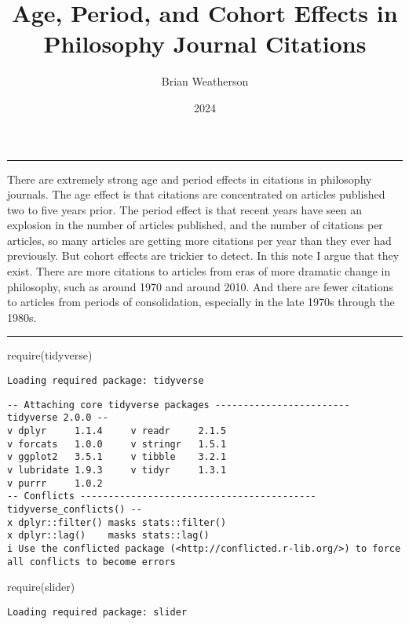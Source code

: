 \documentclass[
  10pt,
  letterpaper,
  DIV=11,
  numbers=noendperiod,
  twoside]{scrartcl}
\title{Age, Period, and Cohort Effects in Philosophy Journal Citations}
\author{Brian Weatherson}
\date{2024}
\newenvironment{Shaded}{\begin{snugshade}}{\end{snugshade}}
\newcommand{\FunctionTok}[1]{\textcolor[rgb]{0.28,0.35,0.67}{#1}}
\newcommand{\NormalTok}[1]{\textcolor[rgb]{0.00,0.23,0.31}{#1}}
\renewenvironment{abstract}
 {\vspace{-1.25cm}
 \quotation\small\noindent\rule{\linewidth}{.5pt}\par\smallskip
 \noindent }
 {\par\noindent\rule{\linewidth}{.5pt}\endquotation}
\begin{document}
\maketitle
\begin{abstract}
There are extremely strong age and period effects in citations in
philosophy journals. The age effect is that citations are concentrated
on articles published two to five years prior. The period effect is that
recent years have seen an explosion in the number of articles published,
and the number of citations per articles, so many articles are getting
more citations per year than they ever had previously. But cohort
effects are trickier to detect. In this note I argue that they exist.
There are more citations to articles from eras of more dramatic change
in philosophy, such as around 1970 and around 2010. And there are fewer
citations to articles from periods of consolidation, especially in the
late 1970s through the 1980s.
\end{abstract}


\begin{Shaded}
\begin{Highlighting}[]
\FunctionTok{require}\NormalTok{(tidyverse)}
\end{Highlighting}
\end{Shaded}

\begin{verbatim}
Loading required package: tidyverse
\end{verbatim}

\begin{verbatim}
-- Attaching core tidyverse packages ------------------------ tidyverse 2.0.0 --
v dplyr     1.1.4     v readr     2.1.5
v forcats   1.0.0     v stringr   1.5.1
v ggplot2   3.5.1     v tibble    3.2.1
v lubridate 1.9.3     v tidyr     1.3.1
v purrr     1.0.2     
-- Conflicts ------------------------------------------ tidyverse_conflicts() --
x dplyr::filter() masks stats::filter()
x dplyr::lag()    masks stats::lag()
i Use the conflicted package (<http://conflicted.r-lib.org/>) to force all conflicts to become errors
\end{verbatim}

\begin{Shaded}
\begin{Highlighting}[]
\FunctionTok{require}\NormalTok{(slider)}
\end{Highlighting}
\end{Shaded}

\begin{verbatim}
Loading required package: slider
\end{verbatim}
\end{document}
